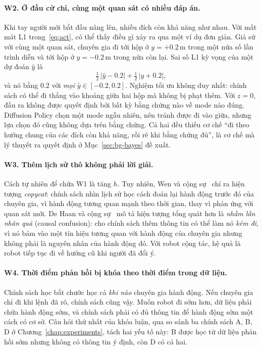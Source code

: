 \paragraph{W2. Ở đầu cử chỉ, cùng một quan sát có nhiều đáp án.} Khi tay người mới bắt đầu nâng lên, nhiều đích còn khả năng như nhau. Với mất mát L1 trong~\eqref{eq:act}, có thể thấy điều gì xảy ra qua một ví dụ đơn giản. Giả sử với cùng một quan sát, chuyên gia đi tới hộp ở $y=+0.2$\,m trong một nửa số lần trình diễn và tới hộp ở $y=-0.2$\,m trong nửa còn lại. Sai số L1 kỳ vọng của một dự đoán $\hat y$ là
\begin{equation}
  \tfrac12\,|\hat y-0.2|+\tfrac12\,|\hat y+0.2|,
\end{equation}
và nó bằng $0.2$ với \emph{mọi} $\hat y\in[-0.2,0.2]$. Nghiệm tối ưu không duy nhất: chính sách có thể đi thẳng vào khoảng giữa hai hộp mà không bị phạt thêm. Với $z=0$, đầu ra không được quyết định bởi bất kỳ bằng chứng nào về mode nào đúng. Diffusion Policy chọn một mode ngẫu nhiên, nên tránh được đi vào giữa, nhưng lựa chọn đó cũng không dựa trên bằng chứng. Cả hai đều thiếu cơ chế ``đi theo hướng chung của các đích còn khả năng, rồi rẽ khi bằng chứng đủ'', là cơ chế mà lý thuyết ra quyết định ở Mục~\ref{sec:bg-bayes} đề xuất.

\paragraph{W3. Thêm lịch sử thô không phải lời giải.} Cách tự nhiên để chữa W1 là tăng $h$. Tuy nhiên, Wen và cộng sự~\cite{wen2020copycat} chỉ ra hiện tượng \emph{copycat}: chính sách nhìn lịch sử học cách đoán lại hành động trước đó của chuyên gia, vì hành động tương quan mạnh theo thời gian, thay vì phản ứng với quan sát mới. De Haan và cộng sự~\cite{dehaan2019causal} mô tả hiện tượng tổng quát hơn là \emph{nhầm lẫn nhân quả} (causal confusion): cho chính sách thêm thông tin có thể làm nó \emph{kém đi}, vì nó bám vào một tín hiệu tương quan với hành động của chuyên gia nhưng không phải là nguyên nhân của hành động đó. Với robot cộng tác, hệ quả là robot tiếp tục đi về hướng cũ khi người đã đổi ý.

\paragraph{W4. Thời điểm phản hồi bị khóa theo thời điểm trong dữ liệu.} Chính sách học bắt chước học cả \emph{khi nào} chuyên gia hành động. Nếu chuyên gia chỉ đi khi lệnh đã rõ, chính sách cũng vậy. Muốn robot đi sớm hơn, dữ liệu phải chứa hành động sớm, và chính sách phải có đủ thông tin để hành động sớm một cách có cơ sở. Câu hỏi thứ nhất của khóa luận, qua so sánh ba chính sách A, B, D ở Chương~\ref{chap:experiments}, tách hai yếu tố này: B được học từ dữ liệu phản hồi sớm nhưng không có thông tin ý định, còn D có cả hai.

